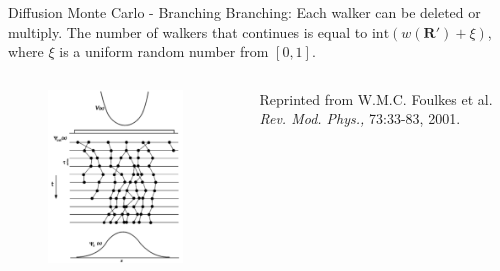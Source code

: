 \documentclass{beamer}
\newcommand{\R}{\mathbf{R}}
\begin{document}
\begin{frame}{Diffusion Monte Carlo - Branching}
Branching: Each walker can be deleted or multiply. The number of walkers that continues is equal to $\mathrm{int}\left(w(\R')+\xi\right)$, where $\xi$ is a uniform random number from $[0,1]$.
\begin{columns}
\begin{column}{0.4\textwidth}
\begin{figure}
   \includegraphics[width=0.9\textwidth]{figures/branch_full.png}
\end{figure}
\end{column}
\begin{column}{0.7\textwidth}
   {\color{blue}{Figure:}} Reprinted from W.M.C. Foulkes et al. \textit{Rev. Mod. Phys.,} 73:33-83, 2001.
\end{column}
\end{columns}
\end{frame}
\end{document}
